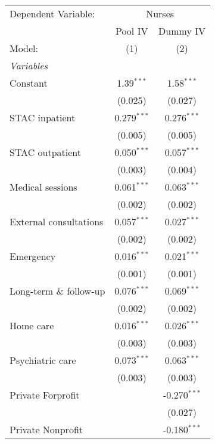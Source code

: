 
\begingroup
\centering
\begin{tabular}{lcc}
   \tabularnewline \midrule \midrule
   Dependent Variable: & \multicolumn{2}{c}{Nurses}\\
                           & Pool IV       & Dummy IV \\   
   Model:                  & (1)           & (2)\\  
   \midrule
   \emph{Variables}\\
   Constant                & 1.39$^{***}$  & 1.58$^{***}$\\   
                           & (0.025)       & (0.027)\\   
   STAC inpatient          & 0.279$^{***}$ & 0.276$^{***}$\\   
                           & (0.005)       & (0.005)\\   
   STAC outpatient         & 0.050$^{***}$ & 0.057$^{***}$\\   
                           & (0.003)       & (0.004)\\   
   Medical sessions        & 0.061$^{***}$ & 0.063$^{***}$\\   
                           & (0.002)       & (0.002)\\   
   External consultations  & 0.057$^{***}$ & 0.027$^{***}$\\   
                           & (0.002)       & (0.002)\\   
   Emergency               & 0.016$^{***}$ & 0.021$^{***}$\\   
                           & (0.001)       & (0.001)\\   
   Long-term \& follow-up  & 0.076$^{***}$ & 0.069$^{***}$\\   
                           & (0.002)       & (0.002)\\   
   Home care               & 0.016$^{***}$ & 0.026$^{***}$\\   
                           & (0.003)       & (0.003)\\   
   Psychiatric care        & 0.073$^{***}$ & 0.063$^{***}$\\   
                           & (0.003)       & (0.003)\\   
   Private Forprofit       &               & -0.270$^{***}$\\   
                           &               & (0.027)\\   
   Private Nonprofit       &               & -0.180$^{***}$\\   

\end{tabular}
